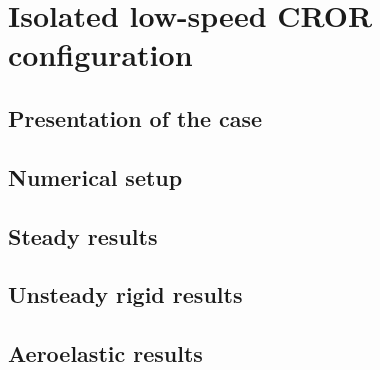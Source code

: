 \chapter{Isolated low-speed CROR configuration}
\label{cha:dream_ls_isolated}

\chabstract{}

\minitoc
\newpage

\section{Presentation of the case}
\label{sec:dream_presentation}


\section{Numerical setup}
\label{sec:dream_numerical}


\section{Steady results}
\label{sec:dream_ls_steady_results}


\section{Unsteady rigid results}
\label{sec:dream_ls_rigid_results}


\section{Aeroelastic results}
\label{sec:dream_ls_ael_results}


\chconclu{}
